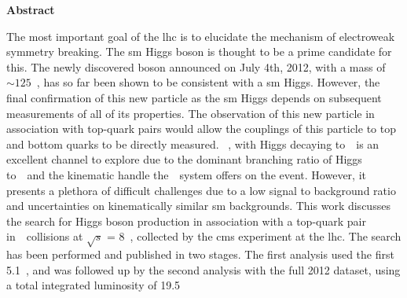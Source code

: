 \begin{center}

\textbf{\Large Abstract}\\[0.25in]

\end{center}

\par The most important goal of the \acrfull{lhc} is to elucidate the mechanism of electroweak symmetry breaking.  The \acrfull{sm} Higgs boson is thought to be a prime candidate for this.  The newly discovered boson announced on July 4th, 2012, with a mass of ${\sim}125$~\GeVcc, has so far been shown to be consistent with a \acrshort{sm} Higgs.  However, the final confirmation of this new particle as the \acrshort{sm} Higgs depends on subsequent measurements of all of its properties.  The observation of this new particle in association with top-quark pairs would allow the couplings of this particle to top and bottom quarks to be directly measured. ~\ttH, with Higgs decaying to~\bbbar~is an excellent channel to explore due to the dominant branching ratio of Higgs to~\bbbar~and  the kinematic handle the~\ttbar~system offers on the event.  However, it presents a plethora of difficult challenges due to a low signal to background ratio and uncertainties on kinematically similar \acrshort{sm} backgrounds.  This work discusses the search for Higgs boson production in association with a top-quark pair in~\pp~collisions at $\sqrt{s}$ = 8~\TeV, collected by the \acrfull{cms} experiment at the \acrshort{lhc}.  The search has been performed and published in two stages.  The first analysis used the first 5.1~\fbinv, and was followed up by the second analysis with the full 2012 dataset, using a total integrated luminosity of 19.5~\fbinv     

